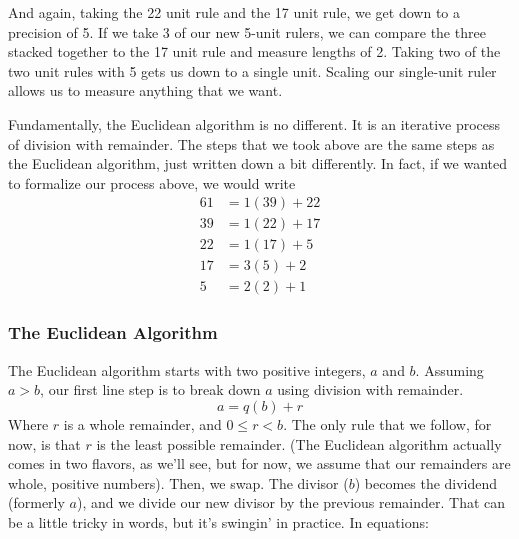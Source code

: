 \documentclass{article}
\begin{document}
\begin{figure}[h!]
\end{figure}
And again, taking the 22 unit rule and the 17 unit rule, we get down to a precision of 5. If we take 3 of our new 5-unit rulers, we can compare the three stacked together to the 17 unit rule and measure lengths of 2. Taking two of the two unit rules with 5 gets us down to a single unit. Scaling our single-unit ruler allows us to measure anything that we want.  

Fundamentally, the Euclidean algorithm is no different. It is an iterative process of division with remainder. The steps that we took above are the same steps as the Euclidean algorithm, just written down a bit differently. In fact, if we wanted to formalize our process above, we would write
\begin{align*} 
	61 &= 1(39) + 22\\
	39 &= 1(22) + 17 \\
	22 &= 1(17) + 5 \\
	17 &= 3(5) + 2 \\
	5 &= 2(2) + 1
\end{align*} 

\subsubsection*{The Euclidean Algorithm} 

The Euclidean algorithm starts with two positive integers, $a$ and $b$. Assuming $a > b$, our first line step is to break down $a$ using division with remainder.  
\[a = q(b) + r\] 
Where $r$ is a whole remainder, and $0 \leq r < b$. The only rule that we follow, for now, is that $r$ is the least possible remainder. (The Euclidean algorithm actually comes in two flavors, as we’ll see, but for now, we assume that our remainders are whole, positive numbers). 
Then, we swap. The divisor ($b$) becomes the dividend (formerly $a$), and we divide our new divisor by the previous remainder. 
That can be a little tricky in words, but it’s swingin’ in practice. 
In equations: 
\end{document}

